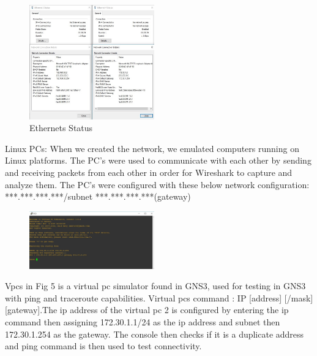 \documentclass{article}
\begin{document}
\begin{figure}[H]
	\begin{center}
		\includegraphics[width=0.48\textwidth]{Ethernet.jpg}
	\end{center}
	\caption{\small Ethernets Status \newline}
	\label{fig:StatusEth}
\end{figure}


Linux PCs: When we created the network, we emulated computers running on Linux platforms. The PC's were used to communicate with each other by sending and receiving packets from each other in order for Wireshark to capture and analyze them. The PC's were configured with these below network configuration:\newline
***.***.***.***/subnet\newline
***.***.***.***(gateway)

\begin{figure}[H]
	\begin{center}
		\includegraphics[width=0.48\textwidth]{VPC.jpg}
	\end{center}
	\caption{\small  \newline}
	\label{fig:VPC}
\end{figure}
Vpcs in Fig 5 is a virtual pc simulator found in GNS3, used for testing in GNS3 with ping and traceroute capabilities. Virtual pcs command : IP [address] [/mask] [gateway].The ip address of the virtual pc 2 is configured by entering the ip command then assigning 172.30.1.1/24 as the ip address and subnet then 172.30.1.254 as the gateway. The console then checks if it is a duplicate address and ping command is then used to test connectivity.
\end{document}
